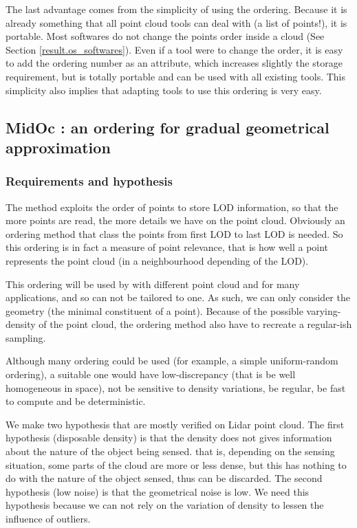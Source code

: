				The last advantage comes from the simplicity of using the ordering. 
				Because it is already something that all point cloud tools can deal with (a list of points!), it is portable. Most softwares do not change the points order inside a cloud (See Section \ref{result.os_softwares}).
				Even if a tool were to change the order, it is easy to add the ordering number as an attribute, which increases slightly the storage requirement, but is totally portable and can be used with all existing tools.
				This simplicity also implies that adapting tools to use this ordering is very easy.
	
	
	\subsection{ MidOc : an ordering for gradual geometrical approximation}
		\label{method:midoc}
		\subsubsection{Requirements and hypothesis}
		
		The method exploits the order of points to store LOD information, so that the more points are read, the more details we have on the point cloud.
		Obviously an ordering method that class the points from first LOD to last LOD is needed.
		So this ordering is in fact a measure of point relevance, that is how well a point represents the point cloud (in a neighbourhood depending of the LOD).
		
		This ordering will be used by with different point cloud and for many applications, and so can not be tailored to one.
		As such, we can only consider the geometry (the minimal constituent of a point).
		Because of the possible varying-density of the point cloud, the ordering method also have to recreate a regular-ish sampling.
		
		Although many ordering could be used (for example, a simple uniform-random ordering),
		a suitable one would have low-discrepancy (that is be well homogeneous in space), not be sensitive to density variations, be regular, be fast to compute and be deterministic.
		
		We make two hypothesis that are mostly verified on Lidar point cloud. The first hypothesis (disposable density)
		is that the density does not gives information about the nature of the object being sensed. 
		that is, depending on the sensing situation, some parts of the cloud are more or less dense, but this has nothing to do with the nature of the object sensed, thus can be discarded.
		The second hypothesis (low noise) is that the geometrical noise is low. We need this hypothesis because we can not rely on the variation of density to lessen the influence of outliers.
		
